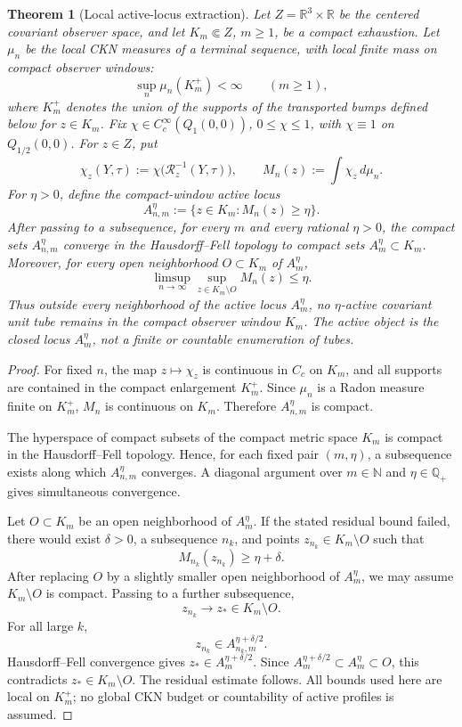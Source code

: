 \documentclass[11pt]{amsart}
\numberwithin{equation}{section}
\theoremstyle{plain}
\newtheorem{theorem}{Theorem}[section]
\theoremstyle{definition}
\theoremstyle{remark}
\newcommand{\calR}{\mathcal R}
\begin{document}
\begin{theorem}[Local active-locus extraction]
\label{lem:maximal-active-family}
\label{thm:maximal-active-family}
Let \(Z=\mathbb R^3\times\mathbb R\) be the centered covariant observer space,
and let \(K_m\Subset Z\), \(m\ge1\), be a compact exhaustion.  Let
\(\mu_n\) be the local CKN measures of a terminal sequence, with local finite
mass on compact observer windows:
\[
   \sup_n\mu_n(K_m^+)<\infty
   \qquad(m\ge1),
\]
where \(K_m^+\) denotes the union of the supports of the transported bumps
defined below for \(z\in K_m\).  Fix
\(\chi\in C_c^\infty(Q_1(0,0))\), \(0\le\chi\le1\), with
\(\chi\equiv1\) on \(Q_{1/2}(0,0)\).  For \(z\in Z\), put
\[
   \chi_z(Y,\tau)
   :=
   \chi\bigl(\calR_z^{-1}(Y,\tau)\bigr),
   \qquad
   M_n(z):=\int \chi_z\,d\mu_n .
\]
For \(\eta>0\), define the compact-window active locus
\[
   A_{n,m}^{\eta}
   :=
   \{z\in K_m:M_n(z)\ge\eta\}.
\]
After passing to a subsequence, for every \(m\) and every rational
\(\eta>0\), the compact sets \(A_{n,m}^{\eta}\) converge in the
Hausdorff--Fell topology to compact sets \(A_m^\eta\subset K_m\).  Moreover,
for every open neighborhood \(O\subset K_m\) of \(A_m^\eta\),
\[
   \limsup_{n\to\infty}
   \sup_{z\in K_m\setminus O}M_n(z)
   \le \eta .
\]
Thus outside every neighborhood of the active locus \(A_m^\eta\), no
\(\eta\)-active covariant unit tube remains in the compact observer window
\(K_m\).  The active object is the closed locus \(A_m^\eta\), not a finite or
countable enumeration of tubes.
\end{theorem}

\begin{proof}
For fixed \(n\), the map \(z\mapsto\chi_z\) is continuous in \(C_c\) on
\(K_m\), and all supports are contained in the compact enlargement \(K_m^+\).
Since \(\mu_n\) is a Radon measure finite on \(K_m^+\), \(M_n\) is continuous
on \(K_m\).  Therefore \(A_{n,m}^{\eta}\) is compact.

The hyperspace of compact subsets of the compact metric space \(K_m\) is
compact in the Hausdorff--Fell topology.  Hence, for each fixed pair
\((m,\eta)\), a subsequence exists along which \(A_{n,m}^{\eta}\) converges.
A diagonal argument over \(m\in\mathbb N\) and
\(\eta\in\mathbb Q_+\) gives simultaneous convergence.

Let \(O\subset K_m\) be an open neighborhood of \(A_m^\eta\).  If the stated
residual bound failed, there would exist \(\delta>0\), a subsequence
\(n_k\), and points \(z_{n_k}\in K_m\setminus O\) such that
\[
   M_{n_k}(z_{n_k})\ge\eta+\delta .
\]
After replacing \(O\) by a slightly smaller open neighborhood of \(A_m^\eta\),
we may assume \(K_m\setminus O\) is compact.  Passing to a further subsequence,
\[
   z_{n_k}\to z_*\in K_m\setminus O .
\]
For all large \(k\),
\[
   z_{n_k}\in A_{n_k,m}^{\eta+\delta/2}.
\]
Hausdorff--Fell convergence gives \(z_*\in A_m^{\eta+\delta/2}\).  Since
\(A_m^{\eta+\delta/2}\subset A_m^\eta\subset O\), this contradicts
\(z_*\in K_m\setminus O\).  The residual estimate follows.  All bounds used
here are local on \(K_m^+\); no global CKN budget or countability of active
profiles is assumed.
\end{proof}
\end{document}
